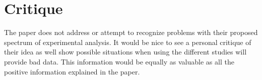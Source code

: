 \documentclass{article}
\begin{document}
\section*{Critique}
The paper does not address or attempt to recognize problems with their proposed spectrum of experimental analysis. It would be nice to see a personal critique of their idea as well show possible situations when using the different studies will provide bad data. This information would be equally as valuable as all the positive information explained in the paper.
\cite{Steinfeld_2009_6322}
\end{document}
